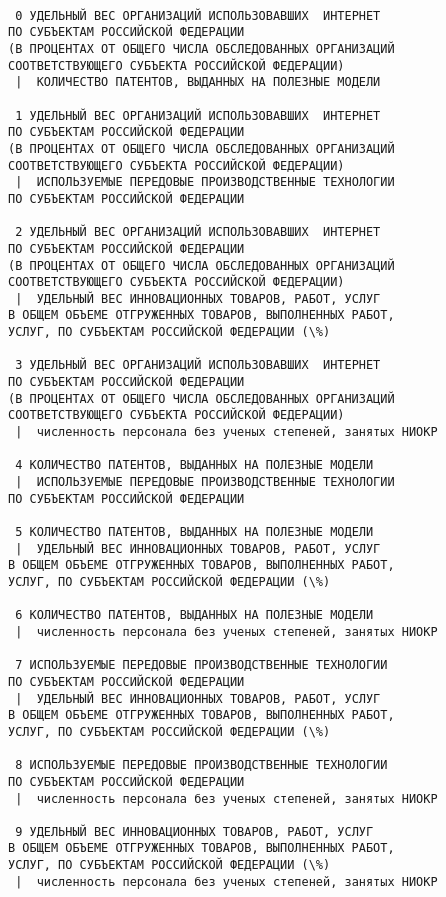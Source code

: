 \documentclass[11pt]{article}
\begin{document}
    \begin{Verbatim}[commandchars=\\\{\}]

 0 УДЕЛЬНЫЙ ВЕС ОРГАНИЗАЦИЙ ИСПОЛЬЗОВАВШИХ  ИНТЕРНЕТ
ПО СУБЪЕКТАМ РОССИЙСКОЙ ФЕДЕРАЦИИ
(В ПРОЦЕНТАХ ОТ ОБЩЕГО ЧИСЛА ОБСЛЕДОВАННЫХ ОРГАНИЗАЦИЙ
СООТВЕТСТВУЮЩЕГО СУБЪЕКТА РОССИЙСКОЙ ФЕДЕРАЦИИ) 
 |  КОЛИЧЕСТВО ПАТЕНТОВ, ВЫДАННЫХ НА ПОЛЕЗНЫЕ МОДЕЛИ

 1 УДЕЛЬНЫЙ ВЕС ОРГАНИЗАЦИЙ ИСПОЛЬЗОВАВШИХ  ИНТЕРНЕТ
ПО СУБЪЕКТАМ РОССИЙСКОЙ ФЕДЕРАЦИИ
(В ПРОЦЕНТАХ ОТ ОБЩЕГО ЧИСЛА ОБСЛЕДОВАННЫХ ОРГАНИЗАЦИЙ
СООТВЕТСТВУЮЩЕГО СУБЪЕКТА РОССИЙСКОЙ ФЕДЕРАЦИИ) 
 |  ИСПОЛЬЗУЕМЫЕ ПЕРЕДОВЫЕ ПРОИЗВОДСТВЕННЫЕ ТЕХНОЛОГИИ
ПО СУБЪЕКТАМ РОССИЙСКОЙ ФЕДЕРАЦИИ

 2 УДЕЛЬНЫЙ ВЕС ОРГАНИЗАЦИЙ ИСПОЛЬЗОВАВШИХ  ИНТЕРНЕТ
ПО СУБЪЕКТАМ РОССИЙСКОЙ ФЕДЕРАЦИИ
(В ПРОЦЕНТАХ ОТ ОБЩЕГО ЧИСЛА ОБСЛЕДОВАННЫХ ОРГАНИЗАЦИЙ
СООТВЕТСТВУЮЩЕГО СУБЪЕКТА РОССИЙСКОЙ ФЕДЕРАЦИИ) 
 |  УДЕЛЬНЫЙ ВЕС ИННОВАЦИОННЫХ ТОВАРОВ, РАБОТ, УСЛУГ
В ОБЩЕМ ОБЪЕМЕ ОТГРУЖЕННЫХ ТОВАРОВ, ВЫПОЛНЕННЫХ РАБОТ,
УСЛУГ, ПО СУБЪЕКТАМ РОССИЙСКОЙ ФЕДЕРАЦИИ (\%)

 3 УДЕЛЬНЫЙ ВЕС ОРГАНИЗАЦИЙ ИСПОЛЬЗОВАВШИХ  ИНТЕРНЕТ
ПО СУБЪЕКТАМ РОССИЙСКОЙ ФЕДЕРАЦИИ
(В ПРОЦЕНТАХ ОТ ОБЩЕГО ЧИСЛА ОБСЛЕДОВАННЫХ ОРГАНИЗАЦИЙ
СООТВЕТСТВУЮЩЕГО СУБЪЕКТА РОССИЙСКОЙ ФЕДЕРАЦИИ) 
 |  численность персонала без ученых степеней, занятых НИОКР

 4 КОЛИЧЕСТВО ПАТЕНТОВ, ВЫДАННЫХ НА ПОЛЕЗНЫЕ МОДЕЛИ 
 |  ИСПОЛЬЗУЕМЫЕ ПЕРЕДОВЫЕ ПРОИЗВОДСТВЕННЫЕ ТЕХНОЛОГИИ
ПО СУБЪЕКТАМ РОССИЙСКОЙ ФЕДЕРАЦИИ

 5 КОЛИЧЕСТВО ПАТЕНТОВ, ВЫДАННЫХ НА ПОЛЕЗНЫЕ МОДЕЛИ 
 |  УДЕЛЬНЫЙ ВЕС ИННОВАЦИОННЫХ ТОВАРОВ, РАБОТ, УСЛУГ
В ОБЩЕМ ОБЪЕМЕ ОТГРУЖЕННЫХ ТОВАРОВ, ВЫПОЛНЕННЫХ РАБОТ,
УСЛУГ, ПО СУБЪЕКТАМ РОССИЙСКОЙ ФЕДЕРАЦИИ (\%)

 6 КОЛИЧЕСТВО ПАТЕНТОВ, ВЫДАННЫХ НА ПОЛЕЗНЫЕ МОДЕЛИ 
 |  численность персонала без ученых степеней, занятых НИОКР

 7 ИСПОЛЬЗУЕМЫЕ ПЕРЕДОВЫЕ ПРОИЗВОДСТВЕННЫЕ ТЕХНОЛОГИИ
ПО СУБЪЕКТАМ РОССИЙСКОЙ ФЕДЕРАЦИИ 
 |  УДЕЛЬНЫЙ ВЕС ИННОВАЦИОННЫХ ТОВАРОВ, РАБОТ, УСЛУГ
В ОБЩЕМ ОБЪЕМЕ ОТГРУЖЕННЫХ ТОВАРОВ, ВЫПОЛНЕННЫХ РАБОТ,
УСЛУГ, ПО СУБЪЕКТАМ РОССИЙСКОЙ ФЕДЕРАЦИИ (\%)

 8 ИСПОЛЬЗУЕМЫЕ ПЕРЕДОВЫЕ ПРОИЗВОДСТВЕННЫЕ ТЕХНОЛОГИИ
ПО СУБЪЕКТАМ РОССИЙСКОЙ ФЕДЕРАЦИИ 
 |  численность персонала без ученых степеней, занятых НИОКР

 9 УДЕЛЬНЫЙ ВЕС ИННОВАЦИОННЫХ ТОВАРОВ, РАБОТ, УСЛУГ
В ОБЩЕМ ОБЪЕМЕ ОТГРУЖЕННЫХ ТОВАРОВ, ВЫПОЛНЕННЫХ РАБОТ,
УСЛУГ, ПО СУБЪЕКТАМ РОССИЙСКОЙ ФЕДЕРАЦИИ (\%) 
 |  численность персонала без ученых степеней, занятых НИОКР

    \end{Verbatim}
\end{document}
